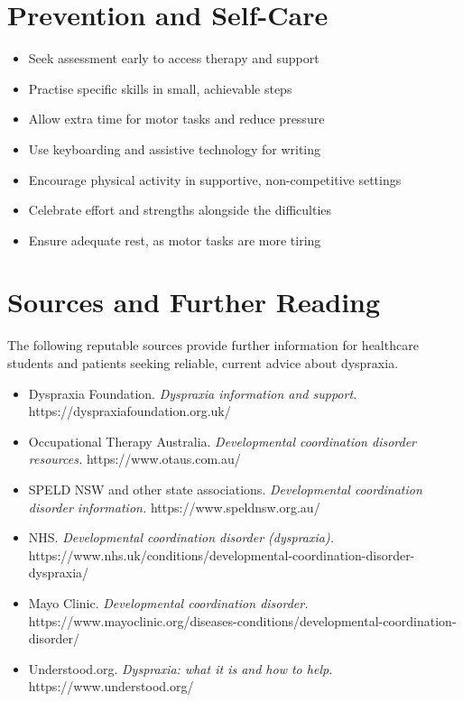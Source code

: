 \section*{Prevention and Self-Care}
\begin{itemize}
    \item Seek assessment early to access therapy and support
    \item Practise specific skills in small, achievable steps
    \item Allow extra time for motor tasks and reduce pressure
    \item Use keyboarding and assistive technology for writing
    \item Encourage physical activity in supportive, non-competitive settings
    \item Celebrate effort and strengths alongside the difficulties
    \item Ensure adequate rest, as motor tasks are more tiring
\end{itemize}

\section*{Sources and Further Reading}
The following reputable sources provide further information for healthcare students and patients seeking reliable, current advice about dyspraxia.
\begin{itemize}
    \item Dyspraxia Foundation. \textit{Dyspraxia information and support.} https://dyspraxiafoundation.org.uk/
    \item Occupational Therapy Australia. \textit{Developmental coordination disorder resources.} https://www.otaus.com.au/
    \item SPELD NSW and other state associations. \textit{Developmental coordination disorder information.} https://www.speldnsw.org.au/
    \item NHS. \textit{Developmental coordination disorder (dyspraxia).} https://www.nhs.uk/conditions/developmental-coordination-disorder-dyspraxia/
    \item Mayo Clinic. \textit{Developmental coordination disorder.} https://www.mayoclinic.org/diseases-conditions/developmental-coordination-disorder/
    \item Understood.org. \textit{Dyspraxia: what it is and how to help.} https://www.understood.org/
\end{itemize}
